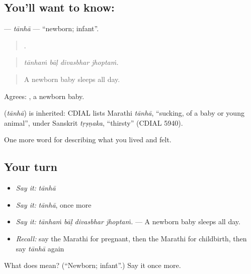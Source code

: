 \subsection*{You'll want to know: }
\textbf{} — \emph{tānhā} — \textquotedblleft{}newborn; infant\textquotedblright{}.

\begin{quote}
   .
\end{quote}

\begin{quote}
\emph{tānhaṁ bāḷ divasbhar jhoptaṁ.}
\end{quote}

\begin{quote}
A newborn baby sleeps all day.
\end{quote}

Agrees:  , a newborn baby.

\begin{cousinweb}
\textbf{} (\emph{tānhā}) is inherited: CDIAL lists Marathi \emph{tānhā}, \textquotedblleft{}sucking, of a baby or young animal\textquotedblright{}, under Sanskrit \emph{tṛṣṇaka}, \textquotedblleft{}thirsty\textquotedblright{} (CDIAL 5940).
\end{cousinweb}

\begin{grammarlens}[title={What you've built}]
One more word for describing what you lived and felt.
\end{grammarlens}

\subsection*{Your turn}
\begin{itemize}
\raggedright
  \item \emph{Say it:} \emph{tānhā}
  \item \emph{Say it:} \emph{tānhā}, once more
  \item \emph{Say it:} \emph{tānhaṁ bāḷ divasbhar jhoptaṁ.} — A newborn baby sleeps all day.
  \item \emph{Recall:} say the Marathi for pregnant, then the Marathi for childbirth, then say \emph{tānhā} again
\end{itemize}

\begin{tcolorbox}[breakable,colback=teal!4,colframe=teal!35!black,title={Before you move on}]
What does  mean? (\textquotedblleft{}Newborn; infant\textquotedblright{}.) Say it once more.
\end{tcolorbox}
